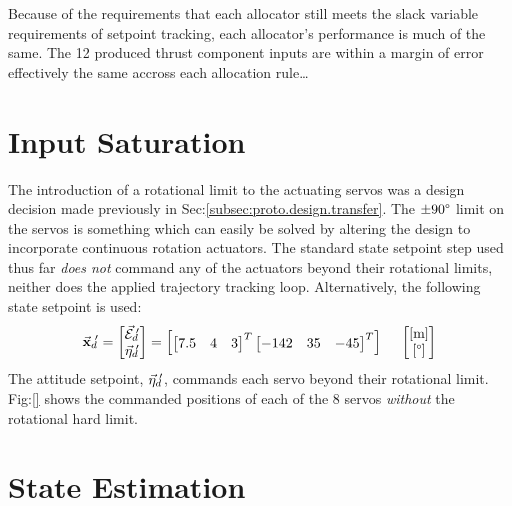 \par
Because of the requirements that each allocator still meets the slack variable requirements of setpoint tracking, each allocator's performance is much of the same. The 12 produced thrust component inputs are within a margin of error effectively the same accross each allocation rule\ldots
\section{Input Saturation}
\label{sec:simulation.saturation}
The introduction of a rotational limit to the actuating servos was a design decision made previously in Sec:\ref{subsec:proto.design.transfer}. The $\pm 90\text{\textdegree}$ limit on the servos is something which can easily be solved by altering the design to incorporate continuous rotation actuators. The standard state setpoint step used thus far \emph{does not} command any of the actuators beyond their rotational limits, neither does the applied trajectory tracking loop. Alternatively, the following state setpoint is used:
\begin{equation}
\vec{\mathbf{x}}_d\text{}\hspace{-2pt}'=
\begin{bmatrix}
\vec{\mathcal{E}}_d\text{}\hspace{-2pt}'\\
\vec{\eta}_d\text{}\hspace{-2pt}'
\end{bmatrix}
=\begin{bmatrix}
\begin{bmatrix}
7.5 & 4 & 3
\end{bmatrix}^T
\begin{bmatrix}
-142 & 35 & -45
\end{bmatrix}^T
\end{bmatrix}
~~~~\begin{bmatrix}
[\text{m}]\\
[\text{\textdegree}]
\end{bmatrix}
\end{equation}
The attitude setpoint, $\vec{\eta}_d\text{}\hspace{-2pt}'$, commands each servo beyond their rotational limit. Fig:\ref{} shows the commanded positions of each of the 8 servos \emph{without} the rotational hard limit.
\section{State Estimation}
\label{sec:simulation.state}

